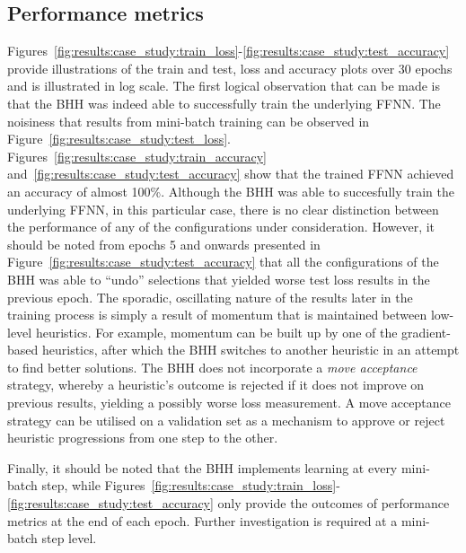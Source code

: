 \subsection{Performance metrics}\label{sec:results:case_study:performance_metrics}

Figures~\ref{fig:results:case_study:train_loss}-\ref{fig:results:case_study:test_accuracy} provide illustrations of the train and test, loss and accuracy plots over 30 epochs and is illustrated in log scale. The first logical observation that can be made is that the \acs{BHH} was indeed able to successfully train the underlying \acs{FFNN}. The noisiness that results from mini-batch training can be observed in Figure~\ref{fig:results:case_study:test_loss}. Figures~\ref{fig:results:case_study:train_accuracy} and~\ref{fig:results:case_study:test_accuracy} show that the trained \acs{FFNN} achieved an accuracy of almost 100\%. Although the \acs{BHH} was able to succesfully train the underlying \acs{FFNN}, in this particular case, there is no clear distinction between the performance of any of the configurations under consideration. However, it should be noted from epochs 5 and onwards presented in Figure~\ref{fig:results:case_study:test_accuracy} that all the configurations of the \acs{BHH} was able to ``undo'' selections that yielded worse test loss results in the previous epoch. The sporadic, oscillating nature of the results later in the training process is simply a result of momentum that is maintained between low-level heuristics. For example, momentum can be built up by one of the gradient-based heuristics, after which the \acs{BHH} switches to another heuristic in an attempt to find better solutions. The \acs{BHH} does not incorporate a \textit{move acceptance} strategy, whereby a heuristic's outcome is rejected if it does not improve on previous results, yielding a possibly worse loss measurement. A move acceptance strategy can be utilised on a validation set as a mechanism to approve or reject heuristic progressions from one step to the other.

Finally, it should be noted that the \acs{BHH} implements learning at every mini-batch step, while Figures~\ref{fig:results:case_study:train_loss}-\ref{fig:results:case_study:test_accuracy} only provide the outcomes of performance metrics at the end of each epoch. Further investigation is required at a mini-batch step level.

